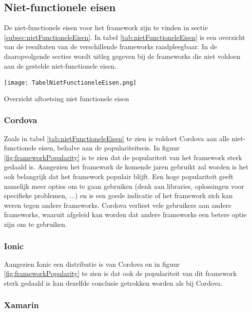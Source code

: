 \subsection{Niet-functionele eisen}
\label{subsec:aftoetsenNietFunctioneleEisen}

De niet-functionele eisen voor het framework zijn te vinden in sectie \ref{subsec:nietFunctioneleEisen}. In tabel \ref{tab:nietFunctioneleEisen} is een overzicht van de resultaten van de verschillende frameworks raadpleegbaar. In de daaropvolgende secties wordt uitleg gegeven bij de frameworks die niet voldoen aan de gestelde niet-functionele eisen.

\begin{table}
    \texttt{[image: TabelNietFunctioneleEisen.png]}
    \caption{Overzicht aftoetsing niet functionele eisen}
    \label{tab:nietFunctioneleEisen}
\end{table}

\subsubsection{Cordova}
\label{subsubsec:CordovaEisen}

Zoals in tabel \ref{tab:nietFunctioneleEisen} te zien is voldoet Cordova aan alle niet-functionele eisen, behalve aan de populariteitseis. In figuur \ref{fig:frameworkPopularity} is te zien dat de populariteit van het framework sterk gedaald is. Aangezien het framework  de komende jaren gebruikt zal worden is het ook belangrijk dat het framework populair blijft. Een hoge populariteit geeft namelijk meer opties om te gaan gebruiken (denk aan libraries, oplossingen voor specifieke problemen, ...) en is een goede indicatie of het framework zich kan weren tegen andere frameworks. Cordova verliest vele gebruikers aan andere frameworks, waaruit afgeleid kan worden dat andere frameworks een betere optie zijn om te gebruiken.

\subsubsection{Ionic}
\label{subsubsec:IonicEisen}

Aangezien Ionic een distributie is van Cordova en in figuur \ref{fig:frameworkPopularity} te zien is dat ook de populariteit van dit framework sterk gedaald is kan dezelfde conclusie getrokken worden als bij Cordova.

\subsubsection{Xamarin}
\label{subsubsec:XamarinEisen}

